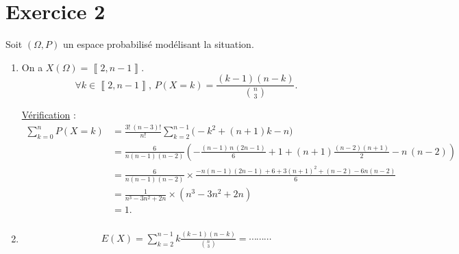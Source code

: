 \part{Exercice 2}

Soit $(\Omega, P)$ un espace probabilisé modélisant la situation.

\begin{enumerate}
	\item On a $X(\Omega) = \left\llbracket 2,n-1 \right\rrbracket$.
		\[
			\forall k \in \left\llbracket 2,n-1 \right\rrbracket,\, P(X = k) = \frac{(k-1)(n-k)}{{n\choose 3}}
		.\]

		\underline{Vérification} :
		\begin{align*}
			\sum_{k=0}^n P(X = k) &= \frac{3!\:(n-3)!}{n!} \sum_{k=2}^{n-1} \big(-k^2 + (n+1)k - n\big) \\
			&= \frac{6}{n(n-1)(n-2)} \left( - \frac{(n-1)\,n\,(2n-1)}{6} + 1 + (n+1) \frac{(n-2)(n+1)}{2} - n\,(n-2) \right) \\
			&= \frac{6}{n(n-1)(n-2)} \times \frac{-n(n-1)(2n-1) + 6 + 3(n+1)^2 + (n-2) - 6n(n-2)}{6} \\
			&= \frac{1}{n^3 -3n^2 + 2n} \times \left( n^3 - 3n^2 + 2n \right)  \\
			&= 1. \\
		\end{align*}
	\item
		\begin{align*}
			E(X) = \sum_{k=2}^{n-1} k \frac{(k-1)(n-k)}{{n\choose 3}} = \cdots\cdots\cdots
		\end{align*}
\end{enumerate}
